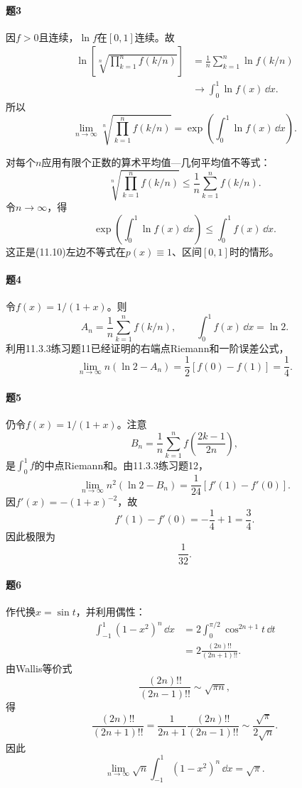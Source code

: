 \paragraph{题3}
\begin{xsolution}
因$f>0$且连续，$\ln f$在$[0,1]$连续。故
\begin{align*}
\ln\left[
\sqrt[n]{\prod_{k=1}^nf(k/n)}
\right]
&=\frac1n\sum_{k=1}^n\ln f(k/n)\\
&\longrightarrow\int_0^1\ln f(x)\,\dd x.
\end{align*}
所以
\[
 \boxed{
 \lim_{n\to\infty}\sqrt[n]{\prod_{k=1}^nf(k/n)}
 =\exp\left(\int_0^1\ln f(x)\,\dd x\right)}.
\]

对每个$n$应用有限个正数的算术平均值—几何平均值不等式：
\[
 \sqrt[n]{\prod_{k=1}^nf(k/n)}
 \le\frac1n\sum_{k=1}^nf(k/n).
\]
令$n\to\infty$，得
\[
 \exp\left(\int_0^1\ln f(x)\,\dd x\right)
 \le\int_0^1f(x)\,\dd x.
\]
这正是(11.10)左边不等式在$p(x)\equiv1$、区间$[0,1]$时的情形。
\end{xsolution}

\paragraph{题4}
\begin{xsolution}
令$f(x)=1/(1+x)$。则
\[
 A_n=\frac1n\sum_{k=1}^nf(k/n),
 \qquad
 \int_0^1f(x)\,\dd x=\ln2.
\]
利用11.3.3练习题11已经证明的右端点Riemann和一阶误差公式，
\[
 \lim_{n\to\infty}n(\ln2-A_n)
 =\frac12[f(0)-f(1)]
 =\boxed{\frac14}.
\]
\end{xsolution}

\paragraph{题5}
\begin{xsolution}
仍令$f(x)=1/(1+x)$。注意
\[
 B_n=\frac1n\sum_{k=1}^n
 f\left(\frac{2k-1}{2n}\right),
\]
是$\int_0^1f$的中点Riemann和。由11.3.3练习题12，
\[
 \lim_{n\to\infty}n^2(\ln2-B_n)
 =\frac1{24}[f'(1)-f'(0)].
\]
因$f'(x)=-(1+x)^{-2}$，故
\[
 f'(1)-f'(0)=-\frac14+1=\frac34.
\]
因此极限为
\[
 \boxed{\frac1{32}}.
\]
\end{xsolution}

\paragraph{题6}
\begin{xsolution}
作代换$x=\sin t$，并利用偶性：
\begin{align*}
\int_{-1}^1(1-x^2)^n\,\dd x
&=2\int_0^{\pi/2}\cos^{2n+1}t\,\dd t\\
&=2\frac{(2n)!!}{(2n+1)!!}.
\end{align*}
由Wallis等价式
\[
 \frac{(2n)!!}{(2n-1)!!}\sim\sqrt{\pi n},
\]
得
\[
 \frac{(2n)!!}{(2n+1)!!}
 =\frac1{2n+1}\frac{(2n)!!}{(2n-1)!!}
 \sim\frac{\sqrt\pi}{2\sqrt n}.
\]
因此
\[
 \boxed{\lim_{n\to\infty}\sqrt n
 \int_{-1}^1(1-x^2)^n\,\dd x=\sqrt\pi}.
\]
\end{xsolution}

